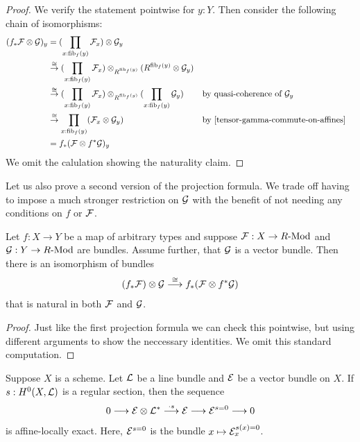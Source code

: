 \begin{proof}
  We verify the statement pointwise for $y:Y$.
  Then consider the following chain of isomorphisms:
  \begingroup
  \let\displaystyle\textstyle
  \begin{align*}
    (f_\ast\mc F \otimes \mc G)_y &= ( \prod_{x:\fib_f(y)} \mc F_x) \otimes \mc G_y \\
                                  &\overset{\cong}{\rightarrow} ( \prod_{x:\fib_f(y)} \mc F_x) \otimes_{R^{\fib_f(y)}} (R^{\fib_f(y)} \otimes \mc G_y) \\
                                  &\overset{\cong}{\rightarrow} ( \prod_{x:\fib_f(y)} \mc F_x) \otimes_{R^{\fib_f(y)}} (\prod_{x:\fib_f(y)} \mc G_y)
                                  && \text{by quasi-coherence of $\mc G_y$} \\
                                  &\overset{\cong}{\rightarrow} \prod_{x:\fib_f(y)} (\mc F_x \otimes \mc G_y)
                                  && \text{by \Cref{tensor-gamma-commute-on-affines}}\\
                                  &= f_\ast (\mc F \otimes f^\ast\mc G)_y
  \end{align*}
  \endgroup
  We omit the calulation showing the naturality claim.
\end{proof}

Let us also prove a second version of the projection formula.
We trade off having to impose a much stronger restriction on $\mathcal{G}$ with the benefit of not needing any conditions on $f$ or $\mathcal{F}$.

\begin{lemma}
  \label{projection-formula-II}
  Let $f : X \to Y$ be a map of arbitrary types and suppose $\mathcal{F} : X \to R\text{-}\mathrm{Mod}$ and $\mathcal{G} : Y \to R\text{-}\mathrm{Mod}$ are bundles.
  Assume further, that $\mathcal{G}$ is a vector bundle.
  Then there is an isomorphism of bundles
  \[
    (f_\ast\mathcal{F}) \otimes \mathcal{G}
    \overset{\cong}{\longrightarrow}
    f_\ast(\mathcal{F} \otimes f^\ast \mathcal{G})
  \]
  that is natural in both $\mathcal{F}$ and $\mathcal{G}$.
\end{lemma}

\begin{proof}
  Just like the first projection formula we can check this pointwise,
  but using different arguments to show the neccessary identities.
  We omit this standard computation.
\end{proof}

\begin{lemma}
  \label{SES-induced-by-regular-section}
  Suppose $X$ is a scheme.
  Let $\mathcal{L}$ be a line bundle and $\mathcal{E}$ be a vector bundle on $X$.
  If $s : H^0(X,\mathcal{L})$ is a regular section, then the sequence
  \[
    0 \longrightarrow \mathcal{E} \otimes \mathcal{L}^\ast
      \overset{\cdot s}{\longrightarrow}  \mathcal{E}
      \longrightarrow \mathcal{E}^{s=0}
      \longrightarrow 0
  \]
  is affine-locally exact.
  Here, $\mathcal{E}^{s=0}$ is the bundle $x \mapsto \mathcal{E}_x^{s(x)=0}$.
\end{lemma}

